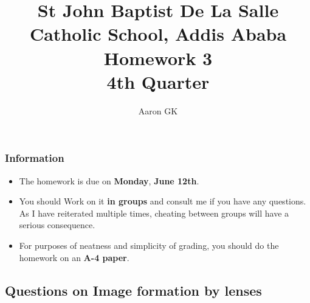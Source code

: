 \documentclass[11pt,addpoints]{exam}
\author{Aaron GK}
\begin{document}
	\title{St John Baptist De La Salle Catholic School, Addis Ababa\\
		\large Homework 3 \\
		4th Quarter}
	\maketitle
	\begin{center}
		\subsubsection*{Information}
		\begin{itemize}
			\item The homework is due on \textbf{Monday}, \textbf{June 12th}.
			\item You should Work on it \textbf{in groups} and consult me if you have any questions. As I have reiterated multiple times, cheating between groups will have a serious consequence.
			\item For purposes of neatness and simplicity of grading, you should do the homework on an \textbf{A-4 paper}.
		\end{itemize}
	\end{center}
	\begin{center}
		\subsection*{Questions on Image formation by lenses}
	\end{center}
	
\end{document}
